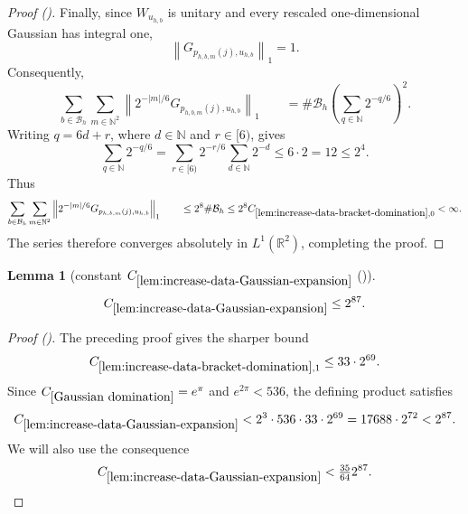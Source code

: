 \documentclass[12pt,reqno]{amsart}
\newcommand{\auto}{{({\tiny\faCar})}}
\theoremstyle{plain}
\newtheorem{lemma}[theorem]{Lemma}
\numberwithin{equation}{section}
\theoremstyle{remark}
\newcommand{\using}[1]{}
\begin{document}
\begin{proof}[Proof \auto]
Finally, since \(W_{u_{h,b}}\) is unitary and every rescaled
one-dimensional Gaussian has integral one,
\[
\left\|
G_{p_{h,b,m}(j),u_{h,b}}
\right\|_1
=
1.
\]
Consequently,
\[
\sum_{b\in\mathcal B_h} \sum_{m\in\mathbb N^2} \left\| 2^{-|m|/6} G_{p_{h,b,m}(j),u_{h,b}} \right\|_1 \qquad= \#\mathcal B_h \left( \sum_{q\in\mathbb N}2^{-q/6} \right)^2.
\]
Writing \(q=6d+r\), where \(d\in\mathbb N\) and \(r\in[6)\), gives
\[
\sum_{q\in\mathbb N}2^{-q/6} = \sum_{r\in[6)} 2^{-r/6} \sum_{d\in\mathbb N}2^{-d} \leq 6\cdot2 = 12 \leq2^4.
\]
Thus
\[
\sum_{b\in\mathcal B_h} \sum_{m\in\mathbb N^2} \left\| 2^{-|m|/6} G_{p_{h,b,m}(j),u_{h,b}} \right\|_1 \qquad\leq 2^8\#\mathcal B_h \leq 2^8 C_{\ref{lem:increase-data-bracket-domination},0} < \infty.
\]
The series therefore converges absolutely in
\(L^1(\mathbb R^2)\), completing the proof.
\end{proof}

\begin{lemma}[constant $C_{\ref{lem:increase-data-Gaussian-expansion}}$ \auto]\label{constant increase data Gaussian expansion}\using{lem:increase-data-bracket-domination}\using{Gaussian domination}\using{lem:increase-data-Gaussian-expansion}
\begin{equation}\label{constant increase data Gaussian expansion bound}
C_{\ref{lem:increase-data-Gaussian-expansion}}\le2^{87}.
\end{equation}
\end{lemma}
\begin{proof}[Proof \auto]
The preceding proof gives the sharper bound
\[
C_{\ref{lem:increase-data-bracket-domination},1}
\le33\cdot2^{69}.
\]
Since $C_{\ref{Gaussian domination}}=e^\pi$ and $e^{2\pi}<536$, the defining product satisfies
\[
C_{\ref{lem:increase-data-Gaussian-expansion}}
<2^3\cdot536\cdot33\cdot2^{69}
=17688\cdot2^{72}
<2^{87}.
\]
We will also use the consequence
\[
C_{\ref{lem:increase-data-Gaussian-expansion}}
<\tfrac{35}{64}2^{87}.
\]
\end{proof}
\end{document}
